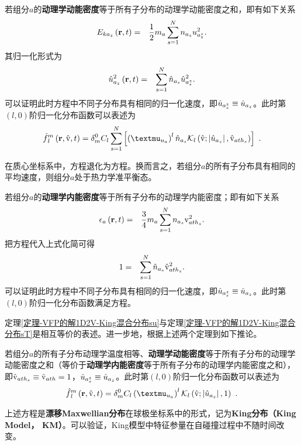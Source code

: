   \begin{proposition} \label{定理-VFP的解1D2V-King混合分布su}
      若组分$a$的\textbf{动理学动能密度}等于所有子分布的动理学动能密度之和，即有如下关系
      \begin{eqnarray}
        E_{{ka}_z} \left(\mathbf{r},t \right) &=& \frac{1}{2} m_a \sum_{s=1}^{N}  n_{a_s} u_{a_z^s}^2 . \label{EkasuaAxis}
      \end{eqnarray}
      其归一化形式为
      \begin{eqnarray}
        {\hat{u}}_{a_z}^2 \left(\mathbf{r},t \right) &=& \sum_{s=1}^{N} \hat{n}_{a_s} {\hat{u}}_{a_s^z}^2 . \label{uhazuazsAxis}
      \end{eqnarray}
      可以证明此时方程中不同子分布具有相同的归一化速度，即${\hat{u}}_{a_s^z} \equiv {\hat{u}}_{a_z}$。此时第$(l,0)$阶归一化分布函数可以表述为
      \begin{eqnarray}
        \fhlm \left(\r,\rmvh,t \right) = \delta_m^0  C_l \sum_{s=1}^{N}  \left [ \left (\muua \right)^l \nhas \Kl \left(\rmvh;\left |\uhaz \right |,\vhaths \right) \right] ~.  \label{fhlfhlnTsu}
      \end{eqnarray}
  \end{proposition}
  \noindent
  在质心坐标系中，方程退化为方程。换而言之，若组分$a$的所有子分布具有相同的平均速度，则组分$a$处于热力学准平衡态。
  
  \begin{proposition} \label{定理-VFP的解1D2V-King混合分布sT}
      若组分$a$的\textbf{动理学内能密度}等于所有子分布的动理学内能密度；即有如下关系
      \begin{eqnarray}
        \epsilon_a \left(\mathbf{r},t \right) &=& \frac{3}{4} m_a \sum_{s=1}^{N}  n_{a_s} {\mathrm{v}}_{{ath}_s}^2 . \label{epsTaAxis}
      \end{eqnarray}
      把方程代入上式化简可得
      \begin{eqnarray}
        1 &=& \sum_{s=1}^{N} \hat{n}_{a_s} \hat{\mathrm{v}}_{{ath}_s}^2 . \label{ThaTasAxis}
      \end{eqnarray}
      可以证明此时方程中不同子分布具有相同的归一化速度，即${\hat{u}}_{a_s^z} \equiv {\hat{u}}_{a_z}$。此时第$(l,0)$阶归一化分布函数满足方程。
  \end{proposition}
  定理\ref{定理-VFP的解1D2V-King混合分布su}与定理\ref{定理-VFP的解1D2V-King混合分布sT}是相互等价的表述。进一步地，根据上述两个定理到如下推论。
  \begin{corollary} \label{定理-VFP的解1D2V-King分布}
      若组分$a$的所有子分布动理学温度相等、\textbf{动理学动能密度}等于所有子分布的动理学动能密度之和（等价于\textbf{动理学内能密度}等于所有子分布的动理学内能密度之和），即$\hat{\mathrm{v}}_{{ath}_s} \equiv \hat{\mathrm{v}}_{ath} = 1$，${\hat{u}}_{a_s^z} \equiv {\hat{u}}_{a_z}$。此时第$(l,0)$阶归一化分布函数可以表述为
      \begin{eqnarray}
            \fhlm \left(\r,\rmvh,t \right) = \delta_m^0 C_l \left(\muua \right)^l \Kl \left(\rmvh;\left |\uhaz \right |,1 \right)  ~.  \label{fhl}
      \end{eqnarray}
  \end{corollary}
  \noindent
  上述方程是\textbf{漂移Maxwellian分布}在球极坐标系中的形式，记为\textbf{King分布（King Model， KM）}。可以验证，King模型中特征参量在自碰撞过程中不随时间改变。

